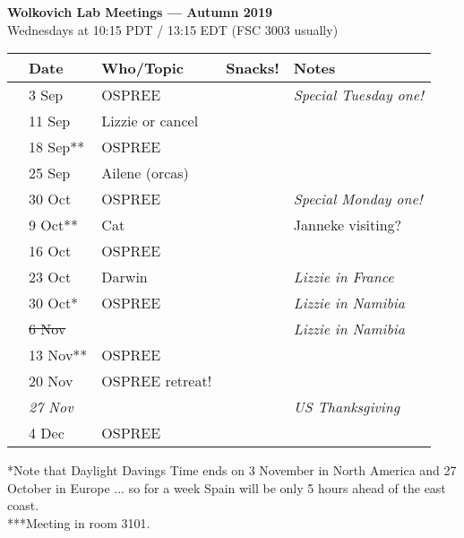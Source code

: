 \documentclass[11pt]{article}
\begin{document}
 
\raggedright
{}

\begin{center} 
{\large \textbf{Wolkovich Lab Meetings --- Autumn 2019}} \\ [2pt]
Wednesdays at 10:15 PDT / 13:15 EDT (FSC 3003 usually)\\
\end{center} 

\begin{center}
\begin{tabular}{ p{0.2 cm}  p{2 cm}  p{5 cm}  p{2 cm}  p{4 cm} }  \hline \hline
 & \textbf{Date}
   & \textbf{Who/Topic}
      & \textbf{Snacks!} 
         & \textbf{Notes} \\ 
\hline \hline
 & 3 Sep & OSPREE &       &  \emph{Special Tuesday one!}\\\hline
 & 11 Sep & Lizzie or cancel &       &  \\\hline
 & 18 Sep** & OSPREE &       & \\\hline  
 & 25 Sep & Ailene (orcas) &       &  \\\hline
 & 30 Oct & OSPREE &       &  \emph{Special Monday one!}\\\hline
 & 9 Oct** & Cat &     & Janneke visiting? \\\hline
 & 16 Oct& OSPREE &       &  \\\hline %
 & 23 Oct  & Darwin &       & \emph{Lizzie in France}  \\\hline
 & 30 Oct* & OSPREE &   & \emph{Lizzie in Namibia}     \\\hline
 & \sout{6 Nov} &  &       &  \emph{Lizzie in Namibia}  \\\hline
 & 13 Nov** & OSPREE &       &  \\\hline
 & 20 Nov & OSPREE retreat!&       &  \\\hline
 & \emph{27 Nov} & &   & \emph{US Thanksgiving} \\\hline
 & 4 Dec & OSPREE &    & \\\hline


\hline
\end{tabular}
\end{center}
*Note that Daylight Davings Time ends on 3 November in North America and 27 October in Europe ... so for a week Spain will be only 5 hours ahead of the east coast.\\
***Meeting in room 3101.
\end{document}
